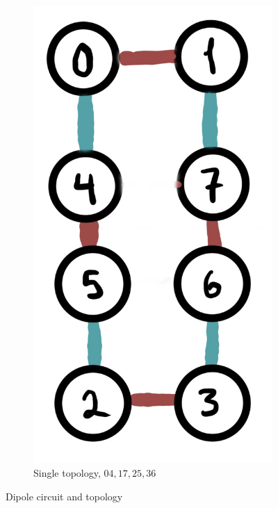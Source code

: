 \documentclass[a4paper,11pt,aps,tightenlines,nofootinbib]{revtex4}
\begin{document}
\begin{figure}[h]
\begin{subfigure}[b]{.2\textwidth}
                \includegraphics[scale=.1]{images/dipole_union.jpg}
                \caption{Single topology, $04,17,25,36$}
                \end{subfigure}
                \caption{Dipole circuit and topology}
        \end{figure}        
\end{document}
